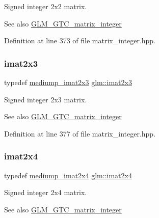 Signed integer 2x2 matrix. \begin{DoxySeeAlso}{See also}
\mbox{\hyperlink{group__gtc__matrix__integer}{G\+L\+M\+\_\+\+G\+T\+C\+\_\+matrix\+\_\+integer}} 
\end{DoxySeeAlso}


Definition at line 373 of file matrix\+\_\+integer.\+hpp.

\mbox{\label{group__gtc__matrix__integer_ga143bc5177bac9991d84b70da03952516}} 
\subsubsection{\texorpdfstring{imat2x3}{imat2x3}}
{\footnotesize\ttfamily typedef \mbox{\hyperlink{group__gtc__matrix__integer_ga07314e9f05b82367570ca44c3ef7c0a7}{mediump\+\_\+imat2x3}} \mbox{\hyperlink{group__gtc__matrix__integer_ga143bc5177bac9991d84b70da03952516}{glm\+::imat2x3}}}

Signed integer 2x3 matrix. \begin{DoxySeeAlso}{See also}
\mbox{\hyperlink{group__gtc__matrix__integer}{G\+L\+M\+\_\+\+G\+T\+C\+\_\+matrix\+\_\+integer}} 
\end{DoxySeeAlso}


Definition at line 377 of file matrix\+\_\+integer.\+hpp.

\mbox{\label{group__gtc__matrix__integer_gafe2d058e164fd1badace451ffcf4ae46}} 
\subsubsection{\texorpdfstring{imat2x4}{imat2x4}}
{\footnotesize\ttfamily typedef \mbox{\hyperlink{group__gtc__matrix__integer_ga944a139f15de6bc12e9c7bf615ffc4f5}{mediump\+\_\+imat2x4}} \mbox{\hyperlink{group__gtc__matrix__integer_gafe2d058e164fd1badace451ffcf4ae46}{glm\+::imat2x4}}}

Signed integer 2x4 matrix. \begin{DoxySeeAlso}{See also}
\mbox{\hyperlink{group__gtc__matrix__integer}{G\+L\+M\+\_\+\+G\+T\+C\+\_\+matrix\+\_\+integer}} 
\end{DoxySeeAlso}


